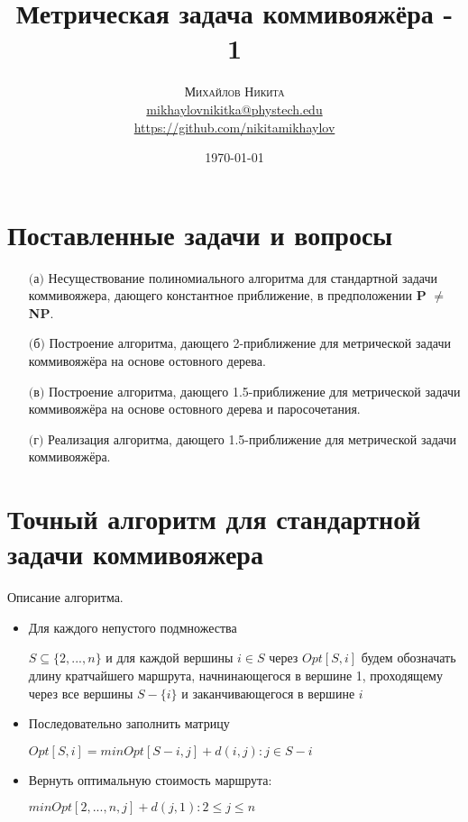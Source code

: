 \documentclass[A4, twocolumn]{article}
\title{
\textbf{Метрическая задача коммивояжёра - 1} 
}
\date{\today}
\author{ 
	\textsc{Михайлов Никита} \\
	\normalsize \href{mailto:mikhaylovnikitka@phystech.edu}{mikhaylovnikitka@phystech.edu} \\
	\normalsize \href{https://github.com/nikitamikhaylov}{https://github.com/nikitamikhaylov}
}
\begin{document}
    \maketitle
    
	
	\section{\textbf{Поставленные задачи и вопросы}}
	
		\begin{enumerate}
			\item[$($а$)$] Несуществование полиномиального алгоритма для стандартной задачи коммивояжера, дающего константное приближение, в предположении \textbf{P} $\ne$ \textbf{NP}.
			\item[$($б$)$] Построение алгоритма, дающего 2-приближение для метрической задачи коммивояжёра на основе остовного дерева.
			\item[$($в$)$] Построение алгоритма, дающего 1.5-приближение для метрической задачи коммивояжёра на основе остовного дерева и паросочетания. 
			\item[$($г$)$] Реализация алгоритма, дающего 1.5-приближение для метрической задачи коммивояжёра.
		\end{enumerate}
	
	\section{\textbf{Точный алгоритм для стандартной задачи коммивояжера}}	
	Описание алгоритма.
	\begin{itemize}
		\item Для каждого непустого подмножества 
		
		$S \subseteq \{2, . . . , n\}$ и для каждой вершины $i \in S$ через $Opt[S,i]$ будем обозначать длину кратчайшего маршрута, начнинающегося в вершине 1, проходящему через все вершины $S − \{i\}$ и заканчивающегося в вершине $i$
		\item Последовательно заполнить матрицу 
		
		$Opt [S , i ] = min{Opt [S − {i }, j ] + d (i , j ) : j ∈ S − {i }}$
		\item Вернуть оптимальную стоимость маршрута: 
		
		$min{Opt[{2,...,n},j]+d(j,1):2 \leq j \leq n}$
	\end{itemize}		
\end{document}
